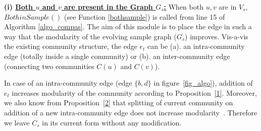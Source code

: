 
\noindent\textbf{(i) \underline{Both $u$ and $v$ are present in the Graph $G_s$:}} When both $u,v$ are in $V_s$, $BothinSample()$ (see Function \ref{bothsample}) is called from 
line 15 of Algorithm \ref{algo_compas}.  
The aim of this module is to place the edge in such a way that the modularity 
of the evolving sample graph ($G_s$) improves. Vis-a-vis the existing community structure, the edge $e_t$ 
can be (a). an intra-community edge (totally inside a single community) or 
(b). an inter-community edge (connecting two communities $C(u)$ and $C(v)$). 

In case of an intra-community edge (edge $\{b,d\}$ in figure~\ref{fig_algo}), addition of $e_t$ 
increases modularity of the community according to Proposition~\ref{1}. Moreover, we also know from Proposition~\ref{2} that 
splitting of current community on addition of a new intra-community edge does not increase modularity~\cite{PhysRevE.78.046115}. 
Therefore we leave $C_s$ in its current form without any modification.

